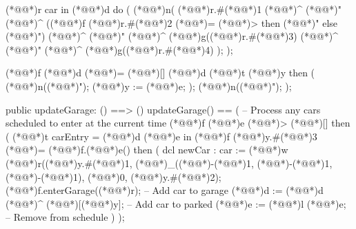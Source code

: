 \documentclass[a4paper]{article}
\begin{document}
\begin{vdm_al}
    (*@@*)r car in (*@@*)d do
    (
        (*@@*)n(
            (*@@*)r.#(*@\vdmnotcovered{}@*)1 (*@\vdmnotcovered{}@*)^ (*@@*)" (*@\vdmnotcovered{}@*)^
            ((*@@*)f (*@@*)r.#(*@\vdmnotcovered{}@*)2 (*@\vdmnotcovered{}@*)= (*@@*)> then (*@@*)" else (*@@*)") (*@\vdmnotcovered{}@*)^ (*@@*)" (*@\vdmnotcovered{}@*)^
            (*@@*)g((*@@*)r.#(*@\vdmnotcovered{}@*)3) (*@\vdmnotcovered{}@*)^ (*@@*)" (*@\vdmnotcovered{}@*)^
            (*@@*)g((*@@*)r.#(*@\vdmnotcovered{}@*)4)
        );
    );

    

    (*@@*)f (*@@*)d (*@\vdmnotcovered{}@*)= (*@\vdmnotcovered{}@*)[] (*@@*)d (*@@*)t (*@@*)y then
    (
        (*@@*)n((*@@*)");
        (*@@*)y := (*@@*)e;
    );
    (*@@*)n((*@@*)");
);


public updateGarage: () ==> ()
updateGarage() ==
(   
    -- Process any cars scheduled to enter at the current time
    (*@@*)f (*@@*)e (*@\vdmnotcovered{<}@*)> (*@\vdmnotcovered{}@*)[] then
    (
        (*@@*)t carEntry = (*@@*)d (*@@*)e in
        (*@@*)f (*@@*)y.#(*@\vdmnotcovered{}@*)3 (*@\vdmnotcovered{}@*)= (*@@*)f.(*@@*)e() then
        (
            dcl newCar : car := (*@@*)w (*@@*)r((*@@*)y.#(*@\vdmnotcovered{}@*)1, (*@@*)_((*@\vdmnotcovered{}@*)-(*@\vdmnotcovered{}@*)1, (*@\vdmnotcovered{}@*)-(*@\vdmnotcovered{}@*)1, (*@\vdmnotcovered{}@*)-(*@\vdmnotcovered{}@*)1), (*@\vdmnotcovered{}@*)0, (*@@*)y.#(*@\vdmnotcovered{}@*)2);
            (*@@*)f.enterGarage((*@@*)r);  -- Add car to garage
            (*@@*)d := (*@@*)d (*@\vdmnotcovered{}@*)^ (*@\vdmnotcovered{}@*)[(*@@*)y];      -- Add car to parked
            (*@@*)e := (*@@*)l (*@@*)e;      -- Remove from schedule
        )
    );


\end{vdm_al}
\end{document}
